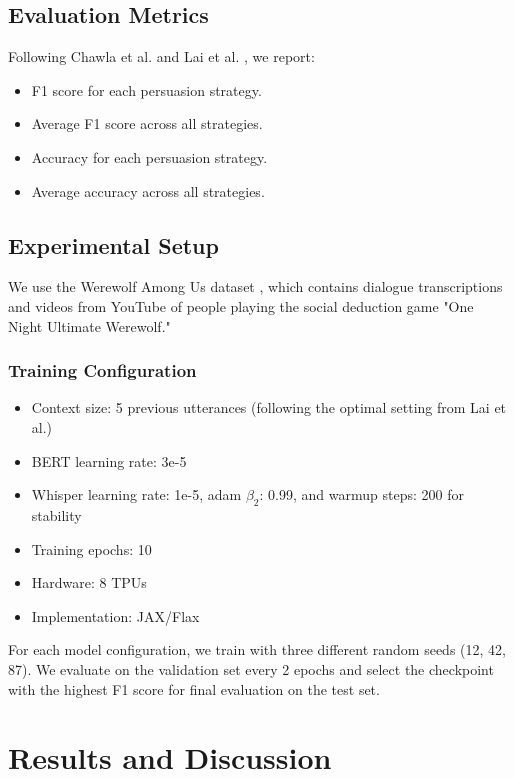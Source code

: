 \documentclass{article}
\begin{document}
\subsection{Evaluation Metrics}
Following Chawla et al. \cite{chawla2021casino} and Lai et al. \cite{lai2022werewolf}, we report:
\begin{itemize}
    \item F1 score for each persuasion strategy.
    \item Average F1 score across all strategies.
    \item Accuracy for each persuasion strategy.
    \item Average accuracy across all strategies.
\end{itemize}

\subsection{Experimental Setup}
We use the Werewolf Among Us dataset \cite{lai2022werewolf}, which contains dialogue transcriptions and videos from YouTube of people playing the social deduction game "One Night Ultimate Werewolf." 

\subsubsection{Training Configuration}
\begin{itemize}
    \item Context size: 5 previous utterances (following the optimal setting from Lai et al.)
    \item BERT learning rate: 3e-5
    \item Whisper learning rate: 1e-5, adam $\beta_2$: 0.99, and warmup steps: 200 for stability
    \item Training epochs: 10
    \item Hardware: 8 TPUs
    \item Implementation: JAX/Flax
\end{itemize}

For each model configuration, we train with three different random seeds (12, 42, 87). We evaluate on the validation set every 2 epochs and select the checkpoint with the highest F1 score for final evaluation on the test set.

\section{Results and Discussion}
\end{document}
